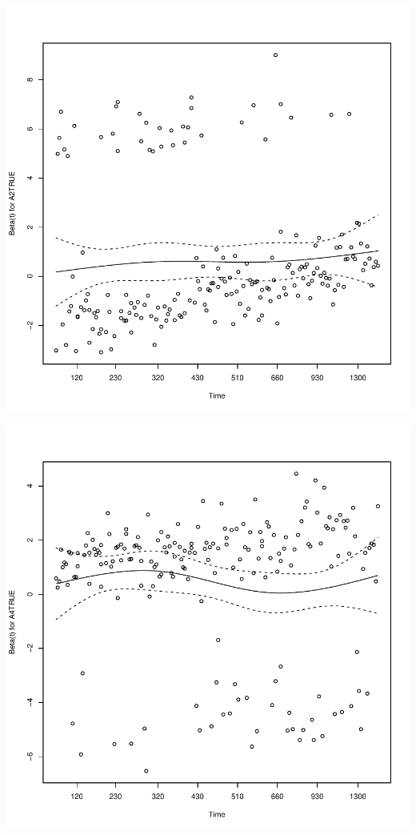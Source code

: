 \documentclass{article}\usepackage[]{graphicx}\usepackage[]{color}
\makeatletter
\def\maxwidth{ %
  \ifdim\Gin@nat@width>\linewidth
    \linewidth
  \else
    \Gin@nat@width
  \fi
}
\newenvironment{knitrout}{}{} %
\makeatother
\begin{document}
\begin{knitrout}
{}




{\centering \includegraphics[width=\maxwidth]{figure/eda-ph-check-full-3-6} 

}




{\centering \includegraphics[width=\maxwidth]{figure/eda-ph-check-full-3-7} 

}



\end{knitrout}
\end{document}
